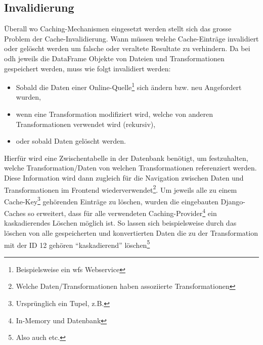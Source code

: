 \subsection{Invalidierung}

Überall wo Caching-Mechanismen eingesetzt werden stellt sich das grosse Problem der Cache-Invalidierung. Wann müssen welche Cache-Einträge invalidiert oder gelöscht werden um falsche oder veraltete Resultate zu verhindern. Da bei \gls{odh} jeweils die DataFrame Objekte von Dateien und Transformationen gespeichert werden, muss wie folgt invalidiert werden:

\begin{itemize}
	\item Sobald die Daten einer Online-Quelle\footnote{Beispielsweise ein \acs{wfs} Webservice} sich ändern bzw. neu Angefordert wurden,
	\item wenn eine Transformation modifiziert wird, welche von anderen Transformationen verwendet wird (rekursiv),
	\item oder sobald Daten gelöscht werden.
\end{itemize}


Hierfür wird eine Zwischentabelle in der Datenbank benötigt, um festzuhalten, welche Transformation/Daten von welchen Transformationen referenziert werden. Diese Information wird dann zugleich für die Navigation zwischen Daten und Transformationen im Frontend wiederverwendet\footnote{Welche Daten/Transformationen haben assoziierte Transformationen}. Um jeweils alle zu einem Cache-Key\footnote{Ursprünglich ein Tupel, z.B. } gehörenden Einträge zu löschen, wurden die eingebauten Django-Caches so erweitert, dass für alle verwendeten Caching-Provider\footnote{In-Memory und Datenbank} ein kaskadierendes Löschen möglich ist. So lassen sich beispielsweise durch das löschen von  alle gespeicherten und konvertierten Daten die zu der Transformation mit der ID 12 gehören ``kaskadierend'' löschen\footnote{Also auch  etc.}
